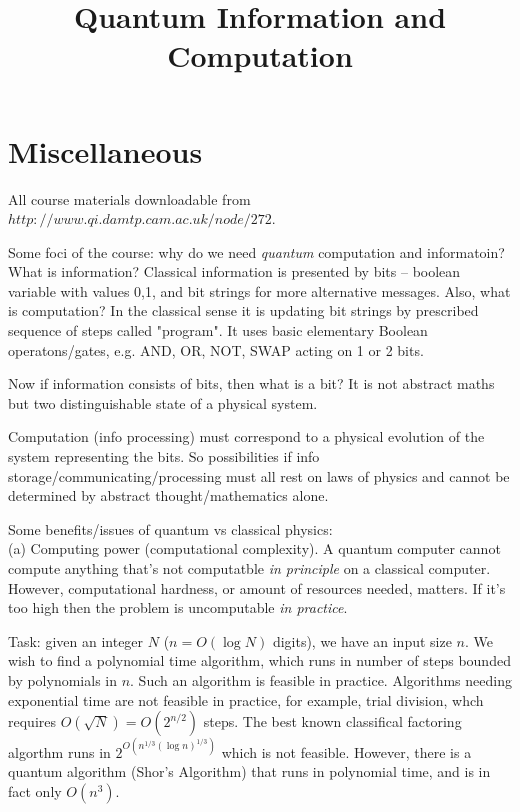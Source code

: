 \documentclass[a4paper]{article}
\begin{document}
\title{Quantum Information and Computation}

\maketitle

\newpage

\tableofcontents

\newpage

\section{Miscellaneous}

All course materials downloadable from $http://www.qi.damtp.cam.ac.uk/node/272$.

Some foci of the course: why do we need \emph{quantum} computation and informatoin? What is information? Classical information is presented by bits -- boolean variable with values 0,1, and bit strings for more alternative messages. Also, what is computation? In the classical sense it is updating bit strings by prescribed sequence of steps called "program". It uses basic elementary Boolean operatons/gates, e.g. AND, OR, NOT, SWAP acting on 1 or 2 bits.

Now if information consists of bits, then what is a bit? It is not abstract maths but two distinguishable state of a physical system.

Computation (info processing) must correspond to a physical evolution of the system representing the bits. So possibilities if info storage/communicating/processing must all rest on laws of physics and cannot be determined by abstract thought/mathematics alone.

Some benefits/issues of quantum vs classical physics:\\
(a) Computing power (computational complexity). A quantum computer cannot compute anything that's not computatble \emph{in principle} on a classical computer. However, computational hardness, or amount of resources needed, matters. If it's too high then the problem is uncomputable \emph{in practice}.

\begin{eg}
Task: given an integer $N$ ($n=O(\log N)$ digits), we have an input size $n$. We wish to find a polynomial time algorithm, which runs in number of steps bounded by polynomials in $n$. Such an algorithm is feasible in practice. Algorithms needing exponential time are not feasible in practice, for example, trial division, whch requires $O(\sqrt{N}) = O(2^{n/2})$ steps. The best known classifical factoring algorthm runs in $2^{O(n^{1/3}(\log n)^{1/3})}$ which is not feasible. However, there is a quantum algorithm (Shor's Algorithm) that runs in polynomial time, and is in fact only $O(n^3)$.
\end{eg}
\end{document}
